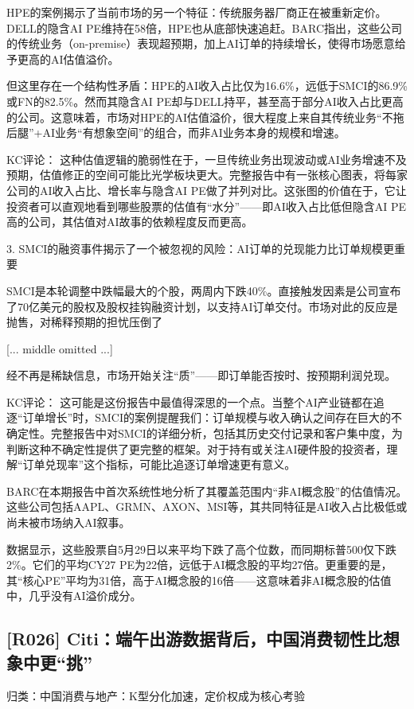 \documentclass[11pt]{ctexart}
\begin{document}
HPE的案例揭示了当前市场的另一个特征：传统服务器厂商正在被重新定价。DELL的隐含AI PE维持在58倍，HPE也从底部快速追赶。BARC指出，这些公司的传统业务（on-premise）表现超预期，加上AI订单的持续增长，使得市场愿意给予更高的AI估值溢价。

但这里存在一个结构性矛盾：HPE的AI收入占比仅为16.6\%，远低于SMCI的86.9\%或FN的82.5\%。然而其隐含AI PE却与DELL持平，甚至高于部分AI收入占比更高的公司。这意味着，市场对HPE的AI估值溢价，很大程度上来自其传统业务“不拖后腿”+AI业务“有想象空间”的组合，而非AI业务本身的规模和增速。

KC评论： 这种估值逻辑的脆弱性在于，一旦传统业务出现波动或AI业务增速不及预期，估值修正的空间可能比光学板块更大。完整报告中有一张核心图表，将每家公司的AI收入占比、增长率与隐含AI PE做了并列对比。这张图的价值在于，它让投资者可以直观地看到哪些股票的估值有“水分”——即AI收入占比低但隐含AI PE高的公司，其估值对AI故事的依赖程度反而更高。

3. SMCI的融资事件揭示了一个被忽视的风险：AI订单的兑现能力比订单规模更重要

SMCI是本轮调整中跌幅最大的个股，两周内下跌40\%。直接触发因素是公司宣布了70亿美元的股权及股权挂钩融资计划，以支持AI订单交付。市场对此的反应是抛售，对稀释预期的担忧压倒了

[... middle omitted ...]

经不再是稀缺信息，市场开始关注“质”——即订单能否按时、按预期利润兑现。

KC评论： 这可能是这份报告中最值得深思的一个点。当整个AI产业链都在追逐“订单增长”时，SMCI的案例提醒我们：订单规模与收入确认之间存在巨大的不确定性。完整报告中对SMCI的详细分析，包括其历史交付记录和客户集中度，为判断这种不确定性提供了更完整的框架。对于持有或关注AI硬件股的投资者，理解“订单兑现率”这个指标，可能比追逐订单增速更有意义。

BARC在本期报告中首次系统性地分析了其覆盖范围内“非AI概念股”的估值情况。这些公司包括AAPL、GRMN、AXON、MSI等，其共同特征是AI收入占比极低或尚未被市场纳入AI叙事。

数据显示，这些股票自5月29日以来平均下跌了高个位数，而同期标普500仅下跌2\%。它们的平均CY27 PE为22倍，远低于AI概念股的平均27倍。更重要的是，其“核心PE”平均为31倍，高于AI概念股的16倍——这意味着非AI概念股的估值中，几乎没有AI溢价成分。

\subsection{[R026] Citi：端午出游数据背后，中国消费韧性比想象中更“挑”}
{\small\color{refgray}归类：中国消费与地产：K型分化加速，定价权成为核心考验}
\end{document}
